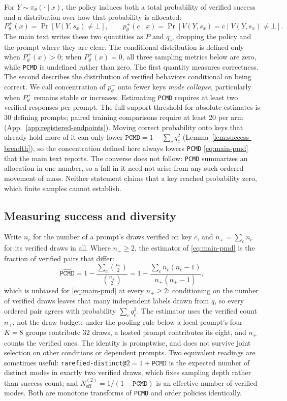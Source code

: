 \documentclass{article}
\newcommand{\1}{\mathbf 1}
\newcommand{\pmd}{\texttt{PCMD}}
\newcommand{\neff}{\ensuremath{N^{(2)}_{\mathrm{eff}}}}
\theoremstyle{remark}
\theoremstyle{definition}
\theoremstyle{plain}
\begin{document}
For $Y\sim\pi_\theta(\cdot\mid x)$, the policy induces both a total probability
of verified success and a distribution over how that probability is allocated:
\[
 P_\theta^+(x)=\Pr[V(Y,s_x)\neq\bot],
 \qquad
 p_\theta^+(c\mid x)=\Pr[V(Y,s_x)=c\mid V(Y,s_x)\neq\bot].
\]
The main text writes these two quantities as $P$ and $q_c$, dropping the
policy and the prompt where they are clear.
The conditional distribution is defined only when $P_\theta^+(x)>0$;
when $P_\theta^+(x)=0$, all three sampling metrics below are zero, while
\pmd{} is undefined rather than zero.
The first quantity measures correctness. The second describes the distribution
of verified behaviors conditional on being correct. We call concentration of
$p_\theta^+$ onto fewer keys \emph{mode collapse}, particularly when
$P_\theta^+$ remains stable or increases. Estimating \pmd{} requires at
least two verified responses per prompt. The full-support threshold for
absolute estimates is 30 defining prompts; paired training comparisons
require at least 20 per arm
(App.~\ref{app:registered-endpoints}).
Moving correct probability onto keys that already hold more of it can only
lower $\pmd{}=1-\sum_c q_c^2$ (Lemma~\ref{lem:success-breadth}), so the
concentration defined here always lowers \pmd{}
\eqref{eq:main-pmd} that the main text reports. The converse does not follow:
\pmd{} summarizes an allocation in one number, so a fall in it need not arise
from any such ordered movement of mass. Neither statement claims that a key
reached probability zero, which finite samples cannot establish.

\subsection{Measuring success and diversity}
\label{app:metric-sampling}

Write $n_c$ for the number of a prompt's draws verified on key $c$, and
$n_+=\sum_c n_c$ for its verified draws in all. Where $n_+\ge2$, the estimator
of \eqref{eq:main-pmd} is the fraction of verified pairs that differ:
\begin{equation}
 \widehat{\pmd}
 =1-\frac{\sum_c \binom{n_c}{2}}{\binom{n_+}{2}}
 =1-\frac{\sum_c n_c(n_c-1)}{n_+(n_+-1)},
 \label{eq:main-pmd-estimator}
\end{equation}
which is unbiased for \eqref{eq:main-pmd} at every $n_+\ge2$: conditioning on
the number of verified draws leaves that many independent labels drawn from
$q$, so every ordered pair agrees with probability $\sum_c q_c^2$. The
estimator uses the verified count $n_+$, not the draw budget: under the
pooling rule below a local prompt's four $K=8$ groups contribute 32 draws, a
hosted prompt contributes its eight, and $n_+$ counts the verified ones. The
identity is promptwise, and does not survive joint selection on other
conditions or dependent prompts. Two equivalent readings are sometimes useful:
\texttt{rarefied-distinct@}$2=1+\pmd$ is the expected number of distinct modes
in exactly two verified draws, which fixes sampling depth rather than success
count; and $\neff=1/(1-\pmd)$ is an effective number of verified modes. Both
are monotone transforms of \pmd{} and order policies identically.
\end{document}
